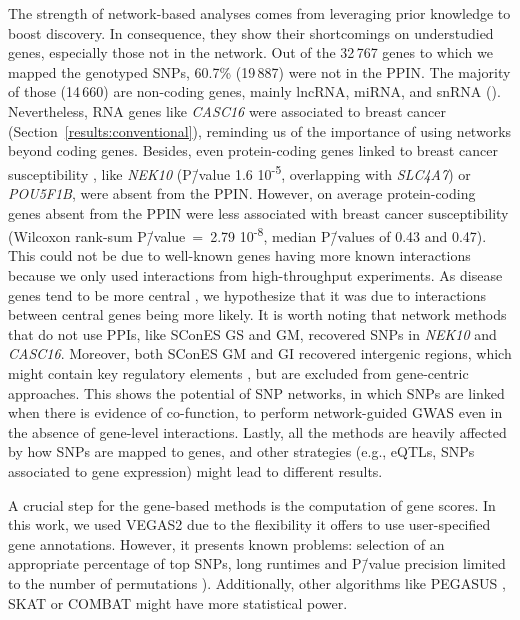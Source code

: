 \documentclass[10pt,letterpaper]{article}
\begin{document}
The strength of network-based analyses comes from leveraging prior knowledge to boost discovery. In consequence, they show their shortcomings on understudied genes, especially those not in the network. Out of the 32\,767 genes to which we mapped the genotyped SNPs, 60.7\% (19\,887) were not in the PPIN. The majority of those (14\,660) are non-coding genes, mainly lncRNA, miRNA, and snRNA (). Nevertheless, RNA genes like \emph{CASC16} were associated to breast cancer (Section~\ref{results:conventional}), reminding us of the importance of using networks beyond coding genes. Besides, even protein-coding genes linked to breast cancer susceptibility \cite{ahmed_newly_2009}, like \emph{NEK10} (P\=/value 1.6 \texttimes{} 10\textsuperscript{-5}, overlapping with \emph{SLC4A7}) or \emph{POU5F1B}, were absent from the PPIN. However, on average protein-coding genes absent from the PPIN were less associated with breast cancer susceptibility (Wilcoxon rank-sum P\=/value~=~2.79 \texttimes{} 10\textsuperscript{-8}, median P\=/values of 0.43 and 0.47). This could not be due to well-known genes having more known interactions because we only used interactions from high-throughput experiments. As disease genes tend to be more central \cite{pinero_uncovering_2016}, we hypothesize that it was due to interactions between central genes being more likely. It is worth noting that network methods that do not use PPIs, like SConES GS and GM, recovered SNPs in \emph{NEK10} and \emph{CASC16}. Moreover, both SConES GM and GI recovered intergenic regions, which might contain key regulatory elements \cite{gallagherPostGWASEraAssociation2018}, but are excluded from gene-centric approaches. This shows the potential of SNP networks, in which SNPs are linked when there is evidence of co-function, to perform network-guided GWAS even in the absence of gene-level interactions. Lastly, all the methods are heavily affected by how SNPs are mapped to genes, and other strategies (e.g., eQTLs, SNPs associated to gene expression) might lead to different results. 

A crucial step for the gene-based methods is the computation of gene scores. In this work, we used VEGAS2 \cite{mishra_vegas2:_2015} due to the flexibility it offers to use user-specified gene annotations. However, it presents known problems: selection of an appropriate percentage of top SNPs, long runtimes and P\=/value precision limited to the number of permutations \cite{nakka_gene_2016}). Additionally, other algorithms like PEGASUS \cite{nakka_gene_2016}, SKAT \cite{ionita-laza_sequence_2013} or COMBAT \cite{wang_combat:_2017} might have more statistical power.
\end{document}

